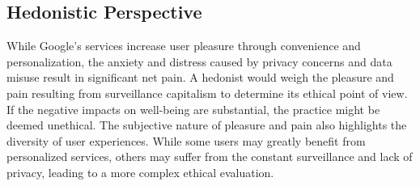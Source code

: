 \subsection{Hedonistic Perspective}\label{subsec:hedonistic-perspective}
While Google's services increase user pleasure through convenience and personalization, the anxiety and distress caused by privacy concerns and data misuse result in significant net pain.
A hedonist would weigh the pleasure and pain resulting from surveillance capitalism to determine its ethical point of view.
If the negative impacts on well-being are substantial, the practice might be deemed unethical.
The subjective nature of pleasure and pain also highlights the diversity of user experiences.
While some users may greatly benefit from personalized services, others may suffer from the constant surveillance and lack of privacy, leading to a more complex ethical evaluation.